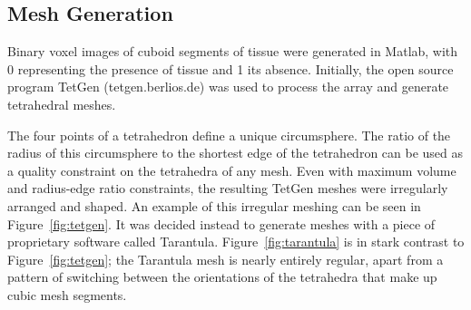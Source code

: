 \subsection{Mesh Generation} %
\label{sec:mesh_generation}
  Binary voxel images of cuboid segments of tissue were generated in Matlab, with 0 representing the presence of tissue and 1 its absence. Initially, the open source program TetGen (tetgen.berlios.de) was used to process the array and generate tetrahedral meshes.
  
  The four points of a tetrahedron define a unique circumsphere. The ratio of the radius of this circumsphere to the shortest edge of the tetrahedron can be used as a quality constraint on the tetrahedra of any mesh. Even with maximum volume and radius-edge ratio constraints, the resulting TetGen meshes were irregularly arranged and shaped. An example of this irregular meshing can be seen in Figure~\ref{fig:tetgen}. It was decided instead to generate meshes with a piece of proprietary software called Tarantula. Figure~\ref{fig:tarantula} is in stark contrast to Figure~\ref{fig:tetgen}; the Tarantula mesh is nearly entirely regular, apart from a pattern of switching between the orientations of the tetrahedra that make up cubic mesh segments.
  
